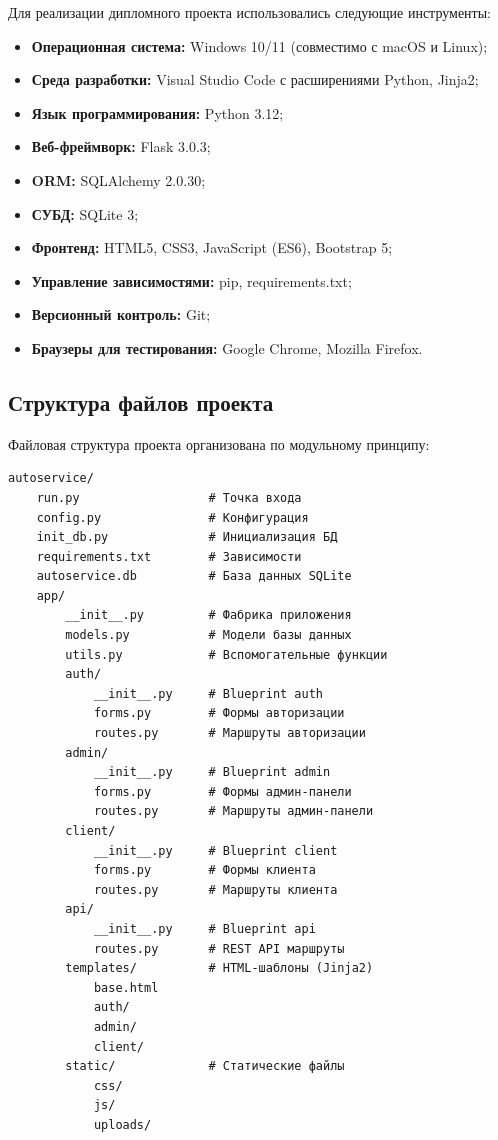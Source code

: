 \documentclass[14pt,a4paper,oneside]{extarticle}
\begin{document}
Для реализации дипломного проекта использовались следующие инструменты:
\begin{itemize}[leftmargin=2cm]
    \item \textbf{Операционная система:} Windows 10/11 (совместимо с macOS и Linux);
    \item \textbf{Среда разработки:} Visual Studio Code с расширениями Python, Jinja2;
    \item \textbf{Язык программирования:} Python 3.12;
    \item \textbf{Веб-фреймворк:} Flask 3.0.3;
    \item \textbf{ORM:} SQLAlchemy 2.0.30;
    \item \textbf{СУБД:} SQLite 3;
    \item \textbf{Фронтенд:} HTML5, CSS3, JavaScript (ES6), Bootstrap 5;
    \item \textbf{Управление зависимостями:} pip, requirements.txt;
    \item \textbf{Версионный контроль:} Git;
    \item \textbf{Браузеры для тестирования:} Google Chrome, Mozilla Firefox.
\end{itemize}

\subsection{Структура файлов проекта}

Файловая структура проекта организована по модульному принципу:

\begin{lstlisting}[language={}, caption={Файловая структура проекта}, label={lst:structure}]
autoservice/
    run.py                  # Точка входа
    config.py               # Конфигурация
    init_db.py              # Инициализация БД
    requirements.txt        # Зависимости
    autoservice.db          # База данных SQLite
    app/
        __init__.py         # Фабрика приложения
        models.py           # Модели базы данных
        utils.py            # Вспомогательные функции
        auth/
            __init__.py     # Blueprint auth
            forms.py        # Формы авторизации
            routes.py       # Маршруты авторизации
        admin/
            __init__.py     # Blueprint admin
            forms.py        # Формы админ-панели
            routes.py       # Маршруты админ-панели
        client/
            __init__.py     # Blueprint client
            forms.py        # Формы клиента
            routes.py       # Маршруты клиента
        api/
            __init__.py     # Blueprint api
            routes.py       # REST API маршруты
        templates/          # HTML-шаблоны (Jinja2)
            base.html
            auth/
            admin/
            client/
        static/             # Статические файлы
            css/
            js/
            uploads/
\end{lstlisting}
\end{document}
